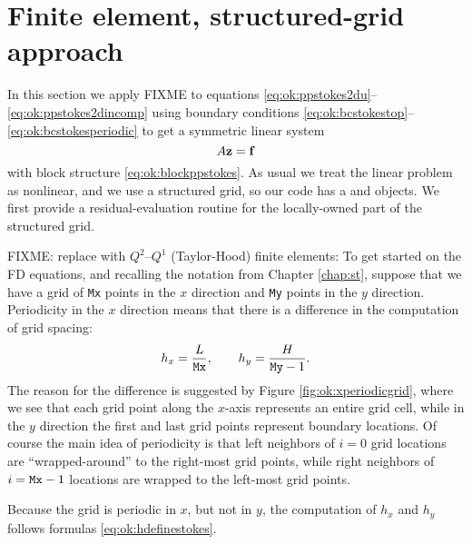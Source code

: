 \section{Finite element, structured-grid approach}

In this section we apply FIXME to equations \eqref{eq:ok:ppstokes2du}--\eqref{eq:ok:ppstokes2dincomp} using boundary conditions \eqref{eq:ok:bcstokestop}--\eqref{eq:ok:bcstokesperiodic} to get a symmetric linear system
\begin{equation}
  A \mathbf{z} = \mathbf{f} \label{eq:ok:linsysstokes}
\end{equation}
with block structure \eqref{eq:ok:blockppstokes}.  As usual we treat the linear problem as nonlinear, and we use a structured grid, so our code has a \pSNES and \pDMDA objects.  We first provide a residual-evaluation routine for the locally-owned part of the structured grid.

FIXME: replace with $Q^2$--$Q^1$ (Taylor-Hood) finite elements:  To get started on the FD equations, and recalling the notation from Chapter \ref{chap:st}, suppose that we have a grid of \texttt{Mx} points in the $x$ direction and \texttt{My} points in the $y$ direction.  Periodicity in the $x$ direction means that there is a difference in the computation of grid spacing:
\begin{equation}
h_x = \frac{L}{\text{\texttt{Mx}}}, \qquad h_y = \frac{H}{\text{\texttt{My}}-1}. \label{eq:ok:hdefinestokes}
\end{equation}
The reason for the difference is suggested by Figure \ref{fig:ok:xperiodicgrid}, where we see that each grid point along the $x$-axis represents an entire grid cell, while in the $y$ direction the first and last grid points represent boundary locations.  Of course the main idea of periodicity is that left neighbors of $i=0$ grid locations are ``wrapped-around'' to the right-most grid points, while right neighbors of $i=\text{\texttt{Mx}}-1$ locations are wrapped to the left-most grid points.

\begin{marginfigure}

\caption{Because the grid is periodic in $x$, but not in $y$, the computation of $h_x$ and $h_y$ follows formulas \eqref{eq:ok:hdefinestokes}.}
\label{fig:ok:xperiodicgrid}
\end{marginfigure}

